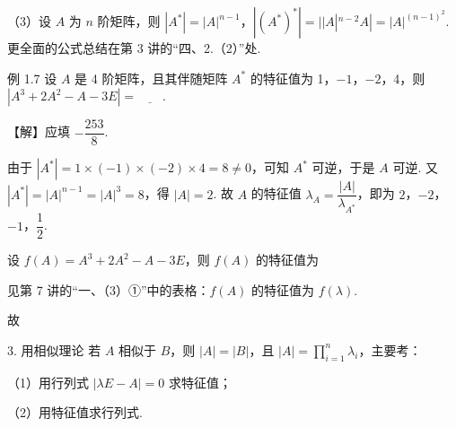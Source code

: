 （3）设 $A$ 为 $n$ 阶矩阵，则 $|A^{*}|=|A|^{n-1}$，$|(A^{*})^{*}|=||A|^{n-2}A|=|A|^{(n-1)^{2}}$. 更全面的公式总结在第 3 讲的“四、2.（2）”处.

\begin{fcard}{例 1.7}
设 $A$ 是 4 阶矩阵，且其伴随矩阵 $A^{*}$ 的特征值为 1，$-1$，$-2$，4，则 $|A^{3}+2A^{2}-A-3E|=\underline{\qquad}$.

【解】应填 $-\dfrac{253}{8}$.


由于 $|A^{*}|=1\times(-1)\times(-2)\times4=8\neq 0$，可知 $A^{*}$ 可逆，于是 $A$ 可逆. 又 $|A^{*}|=|A|^{n-1}=|A|^{3}=8$，得 $|A|=2$. 故 $A$ 的特征值 $\lambda_A=\dfrac{|A|}{\lambda_{A^{*}}}$，即为 $2$，$-2$，$-1$，$\dfrac{1}{2}$.

设 $f(A)=A^{3}+2A^{2}-A-3E$，则 $f(A)$ 的特征值为

见第 7 讲的“一、（3）①”中的表格：$f(A)$ 的特征值为 $f(\lambda)$.

故
\end{fcard}

\begin{fcard}{3. 用相似理论}
若 $A$ 相似于 $B$，则 $|A|=|B|$，且 $|A|=\prod\limits_{i=1}^{n}\lambda_i$，主要考：

（1）用行列式 $|\lambda E-A|=0$ 求特征值；

（2）用特征值求行列式.
\end{fcard}


